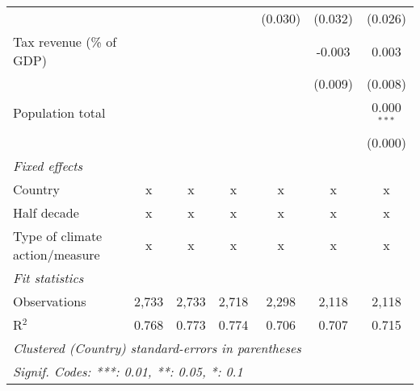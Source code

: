 \begin{tabular}{lcccccc}
                                                             &         &              &               & (0.030)       & (0.032)       & (0.026)\\   
   Tax revenue (\% of GDP)                                   &         &              &               &               & -0.003        & 0.003\\   
                                                             &         &              &               &               & (0.009)       & (0.008)\\   
   Population total                                          &         &              &               &               &               & 0.000$^{***}$\\   
                                                             &         &              &               &               &               & (0.000)\\   
   \emph{Fixed effects}\\
   Country                                                   & x       & x            & x             & x             & x             & x\\  
   Half decade                                               & x       & x            & x             & x             & x             & x\\  
   Type of climate action/measure                            & x       & x            & x             & x             & x             & x\\  
   \midrule \emph{Fit statistics}\\
   Observations                                              & 2,733   & 2,733        & 2,718         & 2,298         & 2,118         & 2,118\\  
   R$^2$                                                     & 0.768   & 0.773        & 0.774         & 0.706         & 0.707         & 0.715\\  
   \midrule
   \multicolumn{7}{l}{\emph{Clustered (Country) standard-errors in parentheses}}\\
   \multicolumn{7}{l}{\emph{Signif. Codes: ***: 0.01, **: 0.05, *: 0.1}}\\
\end{tabular}
\par\endgroup


